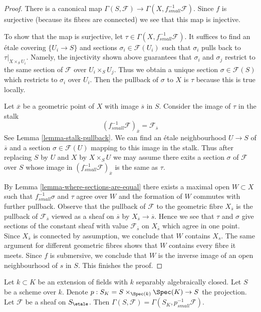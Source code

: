 \begin{proof}
There is a canonical map
$\Gamma(S, \mathcal{F}) \to \Gamma(X, f_{small}^{-1}\mathcal{F})$.
Since $f$ is surjective (because its fibres are connected) we see that
this map is injective.

\medskip\noindent
To show that the map is surjective, let
$\tau \in \Gamma(X, f_{small}^{-1}\mathcal{F})$.
It suffices to find
an \'etale covering $\{U_i \to S\}$ and
sections $\sigma_i \in \mathcal{F}(U_i)$
such that $\sigma_i$ pulls back to $\tau|_{X \times_S U_i}$.
Namely, the injectivity shown above guarantees
that $\sigma_i$ and $\sigma_j$ restrict to the same
section of $\mathcal{F}$ over $U_i \times_S U_j$.
Thus we obtain a unique section $\sigma \in \mathcal{F}(S)$
which restricts to $\sigma_i$ over $U_i$.
Then the pullback of $\sigma$ to $X$ is $\tau$
because this is true locally.

\medskip\noindent
Let $\overline{x}$ be a geometric point of $X$ with image $\overline{s}$
in $S$. Consider the image of $\tau$ in the stalk
$$
(f_{small}^{-1}\mathcal{F})_{\overline{x}} = \mathcal{F}_{\overline{s}}
$$
See Lemma \ref{lemma-stalk-pullback}.
We can find an \'etale neighbourhood $U \to S$ of $\overline{s}$
and a section $\sigma \in \mathcal{F}(U)$ mapping to this image
in the stalk. Thus after replacing $S$ by $U$ and $X$ by $X \times_S U$
we may assume there exits a section $\sigma$ of $\mathcal{F}$ over $S$
whose image in $(f_{small}^{-1}\mathcal{F})_{\overline{x}}$ is the
same as $\tau$.

\medskip\noindent
By Lemma \ref{lemma-where-sections-are-equal}
there exists a maximal open $W \subset X$ such that
$f_{small}^{-1}\sigma$ and $\tau$ agree over $W$
and the formation of $W$ commutes with further pullback.
Observe that the pullback of $\mathcal{F}$ to the
geometric fibre $X_{\overline{s}}$ is the pullback
of $\mathcal{F}_{\overline{s}}$ viewed as a sheaf on
$\overline{s}$ by $X_{\overline{s}} \to \overline{s}$.
Hence we see that $\tau$ and $\sigma$ give sections
of the constant sheaf with value $\mathcal{F}_{\overline{s}}$
on $X_{\overline{s}}$ which agree in one point. Since
$X_{\overline{s}}$ is connected by assumption, we conclude
that $W$ contains $X_s$. The same argument for different
geometric fibres shows that $W$ contains every fibre it meets.
Since $f$ is submersive, we conclude that $W$ is the inverse
image of an open neighbourhood of $s$ in $S$.
This finishes the proof.
\end{proof}

\begin{lemma}
\label{lemma-sections-base-field-extension}
Let $k \subset K$ be an extension of fields with $k$ separably
algebraically closed. Let $S$ be a scheme over $k$. Denote
$p : S_K = S \times_{\Spec(k)} \Spec(K) \to S$ the projection.
Let $\mathcal{F}$ be a sheaf on $S_\etale$.
Then $\Gamma(S, \mathcal{F}) = \Gamma(S_K, p^{-1}_{small}\mathcal{F})$.
\end{lemma}

